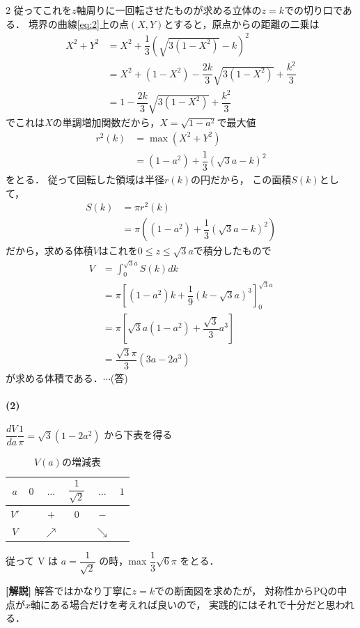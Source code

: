 \documentclass[../../main.tex]{subfiles}
\begin{document}
\begin{multicols}{2}
従ってこれを$z$軸周りに一回転させたものが求める立体の$z=k$での切り口である．
境界の曲線\cref{eq:2}上の点$(X,Y)$とすると，原点からの距離の二乗は
\begin{align}
X^2+Y^2
& = X^2 + \dfrac{1}{3}\left(\sqrt{3(1-X^2)}-k\right)^2          \\
& = X^2 + (1-X^2) -\dfrac{2k}{3}\sqrt{3(1-X^2)} + \dfrac{k^2}{3} \\
& = 1 -\dfrac{2k}{3}\sqrt{3(1-X^2)} + \dfrac{k^2}{3}
\end{align}
でこれは$X$の単調増加関数だから，$X=\sqrt{1-a^2}$で最大値
\begin{align}
r^2(k)
& = \max (X^2+Y^2) \\
& =  (1-a^2) + \dfrac{1}{3}\left(\sqrt{3}a-k\right)^2
\end{align}
をとる．
従って回転した領域は半径$r(k)$の円だから，
この面積$S(k)$として，
\begin{align}
S(k)
& = \pi r^2(k)                                                          \\
& = \pi \left( (1-a^2) + \dfrac{1}{3} \left(\sqrt{3}a-k\right)^2 \right)
\end{align}
だから，求める体積$V$はこれを$0\le z\le \sqrt{3}a$で積分したもので
\begin{align}
V
& = \int_0^{\sqrt{3}a} S(k) dk                                                         \\
& = \pi \left[ (1-a^2)k + \dfrac{1}{9} \left(k-\sqrt{3}a\right)^3 \right]_0^{\sqrt{3}a} \\
& = \pi \left[ \sqrt{3}a(1-a^2) + \dfrac{\sqrt{3}}{3}a^3 \right]                        \\
& = \dfrac{\sqrt{3}\pi}{3}(3a-2a^3)
\end{align}
が求める体積である．$\cdots$(答)

\paragraph{(2)}

$\dfrac{dV}{da}\dfrac{1}{\pi} = \sqrt{3} (1 - 2a^2)$ から下表を得る
\begin{table}[htb]
\centering
\caption{$V(a)$の増減表}
\begin{tabular}{|c||c|c|c|c|c|}
\hline
$a$  & $0$ & $\dots$    & $\dfrac{1}{\sqrt{2}}$ & $\dots$    & $1$ \\
\hline
$V'$ &     & $+$        & $0$                  & $-$        &     \\
\hline
$V$  &     & $\nearrow$ &                      & $\searrow$ &     \\
\hline
\end{tabular}
\end{table}

従って V は $a=\dfrac{1}{\sqrt{2}}$ の時，max $\dfrac{1}{3}\sqrt{6}\pi$ をとる．

{\bf [解説]}
解答ではかなり丁寧に$z=k$での断面図を求めたが，
対称性からPQの中点が$x$軸にある場合だけを考えれば良いので，
実践的にはそれで十分だと思われる．

\newpage
\end{multicols}
\end{document}
